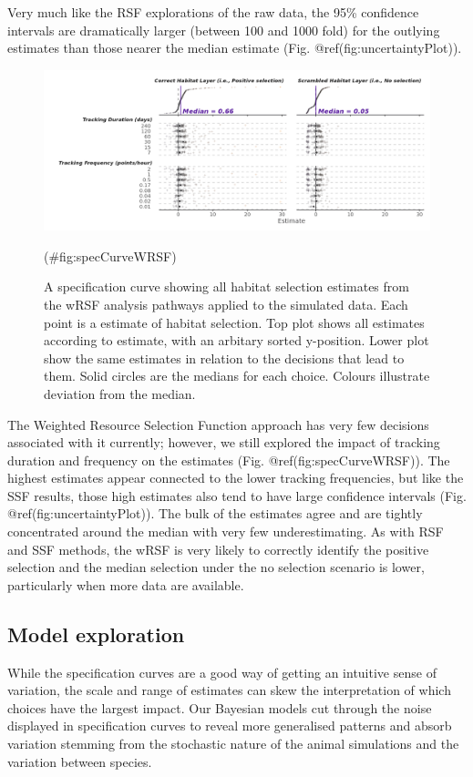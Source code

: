 \documentclass[10pt,a4paper]{article}
\begin{document}
Very much like the RSF explorations of the raw data, the 95\% confidence intervals are dramatically larger (between 100 and 1000 fold) for the outlying estimates than those nearer the median estimate (Fig. @ref(fig:uncertaintyPlot)).

\begin{figure}
\includegraphics[width=1\linewidth]{../figures/wrsfSpecCurve} \caption{A specification curve showing all habitat selection estimates from the wRSF analysis pathways applied to the simulated data. Each point is a estimate of habitat selection. Top plot shows all estimates according to estimate, with an arbitary sorted y-position. Lower plot show the same estimates in relation to the decisions that lead to them. Solid circles are the medians for each choice. Colours illustrate deviation from the median.}(\#fig:specCurveWRSF)
\end{figure}

The Weighted Resource Selection Function approach has very few decisions associated with it currently; however, we still explored the impact of tracking duration and frequency on the estimates (Fig. @ref(fig:specCurveWRSF)).
The highest estimates appear connected to the lower tracking frequencies, but like the SSF results, those high estimates also tend to have large confidence intervals (Fig. @ref(fig:uncertaintyPlot)).
The bulk of the estimates agree and are tightly concentrated around the median with very few underestimating.
As with RSF and SSF methods, the wRSF is very likely to correctly identify the positive selection and the median selection under the no selection scenario is lower, particularly when more data are available.

\subsection{Model exploration}\label{model-exploration}

While the specification curves are a good way of getting an intuitive sense of variation, the scale and range of estimates can skew the interpretation of which choices have the largest impact.
Our Bayesian models cut through the noise displayed in specification curves to reveal more generalised patterns and absorb variation stemming from the stochastic nature of the animal simulations and the variation between species.
\end{document}
